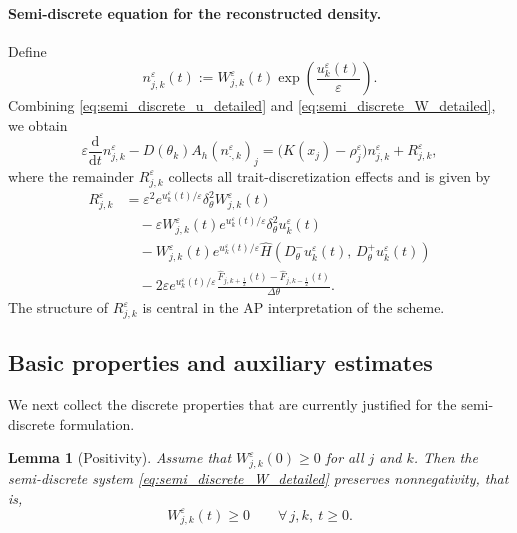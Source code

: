 \documentclass[11pt, dina4, amsfont12]{article}
\newtheorem{lemma}{Lemma}[section]
\begin{document}
\paragraph{Semi-discrete equation for the reconstructed density.}
Define
\[
n_{j,k}^\varepsilon(t)
:=
W_{j,k}^\varepsilon(t)
\exp\!\left(\frac{u_k^\varepsilon(t)}{\varepsilon}\right).
\]
Combining \eqref{eq:semi_discrete_u_detailed} and \eqref{eq:semi_discrete_W_detailed}, we obtain
\begin{equation}\label{eq:semi_discrete_n}
\varepsilon\frac{\mathrm d}{\mathrm dt} n_{j,k}^\varepsilon
-
D(\theta_k) A_h\!\left(n_{\cdot,k}^\varepsilon\right)_j
=
\bigl(K(x_j)-\rho_j^\varepsilon\bigr) n_{j,k}^\varepsilon
+
R_{j,k}^\varepsilon,
\end{equation}
where the remainder \(R_{j,k}^\varepsilon\) collects all trait-discretization effects and is given by
\begin{align}
R_{j,k}^\varepsilon
&=
\varepsilon^2
 e^{u_k^\varepsilon(t)/\varepsilon}
\delta_\theta^2 W_{j,k}^\varepsilon(t)
\nonumber\\
&\quad
-\varepsilon
W_{j,k}^\varepsilon(t)
 e^{u_k^\varepsilon(t)/\varepsilon}
\delta_\theta^2 u_k^\varepsilon(t)
\nonumber\\
&\quad
-
W_{j,k}^\varepsilon(t)
 e^{u_k^\varepsilon(t)/\varepsilon}
\widehat H\!\left(D_\theta^- u_k^\varepsilon(t),\,D_\theta^+ u_k^\varepsilon(t)\right)
\nonumber\\
&\quad
-2\varepsilon
 e^{u_k^\varepsilon(t)/\varepsilon}
\frac{\widehat F_{j,k+\frac12}(t)-\widehat F_{j,k-\frac12}(t)}{\Delta\theta}.
\label{eq:R_exact}
\end{align}
The structure of \(R_{j,k}^\varepsilon\) is central in the AP interpretation of the scheme.

\subsection{Basic properties and auxiliary estimates}

We next collect the discrete properties that are currently justified for the semi-discrete formulation.

\begin{lemma}[Positivity]\label{lem:positivity_W}
Assume that \(W_{j,k}^\varepsilon(0)\ge0\) for all \(j\) and \(k\). Then the semi-discrete system \eqref{eq:semi_discrete_W_detailed} preserves nonnegativity, that is,
\[
W_{j,k}^\varepsilon(t)\ge0
\qquad
\forall\,j,k,\ t\ge0.
\]
\end{lemma}
\end{document}
